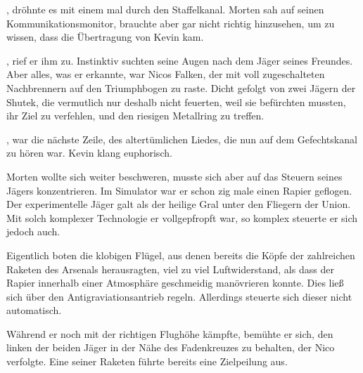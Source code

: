 , dröhnte es mit einem mal durch den Staffelkanal. Morten sah auf seinen Kommunikationsmonitor, brauchte aber gar nicht richtig hinzusehen, um zu wissen, dass die Übertragung von Kevin kam.

\par

, rief er ihm zu. Instinktiv suchten seine Augen nach dem Jäger seines Freundes. Aber alles, was er erkannte, war Nicos Falken, der mit voll zugeschalteten Nachbrennern auf den Triumphbogen zu raste. Dicht gefolgt von zwei Jägern der Shutek, die vermutlich nur deshalb nicht feuerten, weil sie befürchten mussten, ihr Ziel zu verfehlen, und den riesigen Metallring zu treffen.

\par

, war die nächste Zeile, des altertümlichen Liedes, die nun auf dem Gefechtskanal zu hören war.  Kevin klang euphorisch.

\par

Morten wollte sich weiter beschweren, musste sich aber auf das Steuern seines Jägers konzentrieren. Im Simulator war er schon zig male einen Rapier geflogen. Der experimentelle Jäger galt als der heilige Gral unter den Fliegern der Union. Mit solch komplexer Technologie er vollgepfropft war, so komplex steuerte er sich jedoch auch.

\par

Eigentlich boten die klobigen Flügel, aus denen bereits die Köpfe der zahlreichen Raketen des Arsenals herausragten, viel zu viel Luftwiderstand, als dass der Rapier innerhalb einer Atmosphäre geschmeidig manövrieren konnte. Dies ließ sich über den Antigraviationsantrieb regeln. Allerdings steuerte sich dieser nicht automatisch.

\par

Während er noch mit der richtigen Flughöhe kämpfte, bemühte er sich, den linken der beiden Jäger in der Nähe des Fadenkreuzes zu behalten, der Nico verfolgte. Eine seiner Raketen führte bereits eine Zielpeilung aus.

\par


